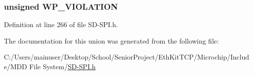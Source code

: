 \subsubsection[{W\+P\+\_\+\+V\+I\+O\+L\+A\+T\+I\+O\+N}]{\setlength{\rightskip}{0pt plus 5cm}unsigned W\+P\+\_\+\+V\+I\+O\+L\+A\+T\+I\+O\+N}\label{union_r_e_s_p_o_n_s_e__2_a7174fd520c10b13ee86cdf7f63aae3cb}


Definition at line 266 of file S\+D-\/\+S\+P\+I.\+h.



The documentation for this union was generated from the following file\+:\begin{DoxyCompactItemize}
\item 
C\+:/\+Users/mainuser/\+Desktop/\+School/\+Senior\+Project/\+Eth\+Kit\+T\+C\+P/\+Microchip/\+Include/\+M\+D\+D File System/\hyperlink{_s_d-_s_p_i_8h}{S\+D-\/\+S\+P\+I.\+h}\end{DoxyCompactItemize}
